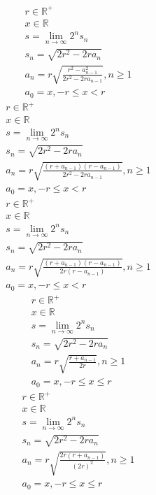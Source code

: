 \documentclass[a4paper,12pt]{report}
\begin{document}
\begin{subequations}
\begin{gather}
r \in \mathbb{R}^+ \\
x \in \mathbb{R} \\
s = \lim \limits_{n \to \infty} 2^n s_n \\
s_n = \sqrt{2r^2 - 2ra_n} \\
a_n = r \sqrt{\frac{r^2 - a_{n-1}^2}{2r^2 - 2ra_{n-1}}}, n \geq 1 \\
a_0 = x, -r \leq x < r
\end{gather}
\end{subequations}
\begin{subequations}
\begin{gather}
r \in \mathbb{R}^+ \\
x \in \mathbb{R} \\
s = \lim \limits_{n \to \infty} 2^n s_n \\
s_n = \sqrt{2r^2 - 2ra_n} \\
a_n = r \sqrt{\frac{(r + a_{n-1}) (r - a_{n-1})}{2r^2 - 2ra_{n-1}}}, n \geq 1 \\
a_0 = x, -r \leq x < r
\end{gather}
\end{subequations}
\begin{subequations}
\begin{gather}
r \in \mathbb{R}^+ \\
x \in \mathbb{R} \\
s = \lim \limits_{n \to \infty} 2^n s_n \\
s_n = \sqrt{2r^2 - 2ra_n} \\
a_n = r \sqrt{\frac{(r + a_{n-1}) (r - a_{n-1})}{2r (r - a_{n-1})}}, n \geq 1 \\
a_0 = x, -r \leq x < r
\end{gather}
\end{subequations}
\begin{subequations}
\begin{gather}
r \in \mathbb{R}^+ \\
x \in \mathbb{R} \\
s = \lim \limits_{n \to \infty} 2^n s_n \\
s_n = \sqrt{2r^2 - 2ra_n} \\
a_n = r \sqrt{\frac{r + a_{n-1}}{2r}}, n \geq 1 \\
a_0 = x, -r \leq x \leq r
\end{gather}
\end{subequations}
\begin{subequations}
\begin{gather}
r \in \mathbb{R}^+ \\
x \in \mathbb{R} \\
s = \lim \limits_{n \to \infty} 2^n s_n \\
s_n = \sqrt{2r^2 - 2ra_n} \\
a_n = r \sqrt{\frac{2r (r + a_{n-1})}{(2r)^2}}, n \geq 1 \\
a_0 = x, -r \leq x \leq r
\end{gather}
\end{subequations}
\end{document}
